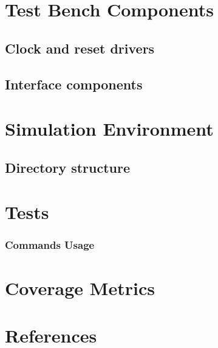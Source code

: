 \documentclass[a4paper,12pt,twoside]{article}
\begin{document}
\section{Test Bench Components}
\subsection{Clock and reset drivers}
\subsection{Interface components}
\section{Simulation Environment}
\subsection{Directory structure}
\section{Tests}
\subsubsection{Commands Usage}
\section{Coverage Metrics}
\section{References}


\printindex
%
%
\end{document}
